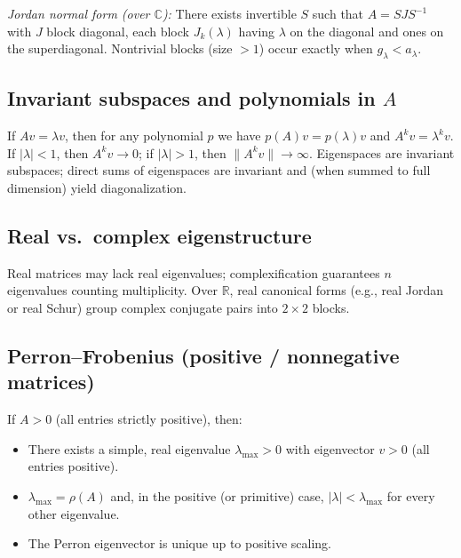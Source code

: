 \documentclass[12pt,a4paper]{article}
\theoremstyle{plain}
\theoremstyle{definition}
\theoremstyle{remark}
\theoremstyle{remark}
\begin{document}
	\smallskip
	
	\emph{Jordan normal form (over $\mathbb{C}$):}
	There exists invertible $S$ such that $A=SJS^{-1}$ with $J$ block diagonal,
	each block $J_k(\lambda)$ having $\lambda$ on the diagonal and ones on the superdiagonal.
	Nontrivial blocks (size $>1$) occur exactly when $g_\lambda<a_\lambda$.
	
	\smallskip
	
	\subsection*{Invariant subspaces and polynomials in $A$}
	
	If $Av=\lambda v$, then for any polynomial $p$ we have $p(A)v=p(\lambda)v$ and $A^k v=\lambda^k v$.
	If $|\lambda|<1$, then $A^k v\to 0$; if $|\lambda|>1$, then $\|A^k v\|\to\infty$.
	Eigenspaces are invariant subspaces; direct sums of eigenspaces are invariant and (when summed to full dimension) yield diagonalization.
	
	\smallskip
	
	\subsection*{Real vs.\ complex eigenstructure}
	
	Real matrices may lack real eigenvalues; complexification guarantees $n$ eigenvalues counting multiplicity.
	Over $\mathbb{R}$, real canonical forms (e.g., real Jordan or real Schur) group complex conjugate pairs into $2\times2$ blocks.
	
	\smallskip
	
	\subsection*{Perron--Frobenius (positive / nonnegative matrices)}
	
	If $A>0$ (all entries strictly positive), then:
	\begin{itemize}
		\item There exists a simple, real eigenvalue $\lambda_{\max}>0$ with eigenvector $v>0$ (all entries positive).
		\item $\lambda_{\max}=\rho(A)$ and, in the positive (or primitive) case, $|\lambda|<\lambda_{\max}$ for every other eigenvalue.
		\item The Perron eigenvector is unique up to positive scaling.
	\end{itemize}
	
\end{document}
